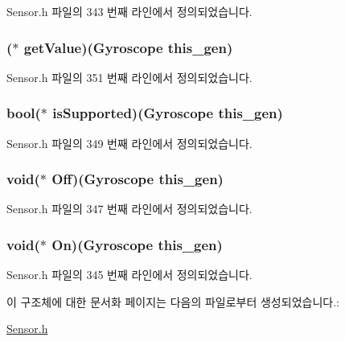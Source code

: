 Sensor.\-h 파일의 343 번째 라인에서 정의되었습니다.

\hypertarget{struct___gyroscope_a9e5519a135ce1a2b58d7e21fd2d53171}{
\subsubsection[{get\-Value}]{($\ast$  get\-Value)({\bf Gyroscope} this\-\_\-gen)}}\label{struct___gyroscope_a9e5519a135ce1a2b58d7e21fd2d53171}


Sensor.\-h 파일의 351 번째 라인에서 정의되었습니다.

\hypertarget{struct___gyroscope_ac0f373cd10a93722406c823688676dee}{
\subsubsection[{is\-Supported}]{\setlength{\rightskip}{0pt plus 5cm}bool($\ast$  is\-Supported)({\bf Gyroscope} this\-\_\-gen)}}\label{struct___gyroscope_ac0f373cd10a93722406c823688676dee}


Sensor.\-h 파일의 349 번째 라인에서 정의되었습니다.

\hypertarget{struct___gyroscope_a16950c07b1deb4c02cd4909b4c78b21e}{
\subsubsection[{Off}]{\setlength{\rightskip}{0pt plus 5cm}void($\ast$  Off)({\bf Gyroscope} this\-\_\-gen)}}\label{struct___gyroscope_a16950c07b1deb4c02cd4909b4c78b21e}


Sensor.\-h 파일의 347 번째 라인에서 정의되었습니다.

\hypertarget{struct___gyroscope_a001e94a565eb41447701e3519d2d7a75}{
\subsubsection[{On}]{\setlength{\rightskip}{0pt plus 5cm}void($\ast$  On)({\bf Gyroscope} this\-\_\-gen)}}\label{struct___gyroscope_a001e94a565eb41447701e3519d2d7a75}


Sensor.\-h 파일의 345 번째 라인에서 정의되었습니다.



이 구조체에 대한 문서화 페이지는 다음의 파일로부터 생성되었습니다.\-:\begin{DoxyCompactItemize}
\item 
\hyperlink{_sensor_8h}{Sensor.\-h}\end{DoxyCompactItemize}
